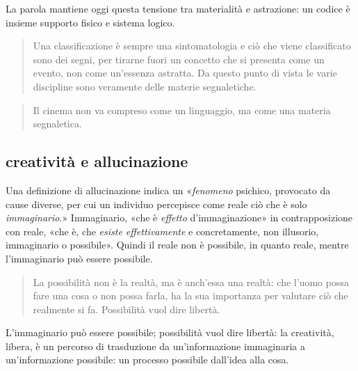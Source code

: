 La parola mantiene oggi questa tensione tra materialità e astrazione: un codice
è insieme supporto fisico e sistema logico.

\begin{quote}
\begin{sf}
\small
  Una classificazione è sempre una sintomatologia e ciò che viene classificato
  sono dei segni, per tirarne fuori un concetto che si presenta come un evento,
  non come un'essenza astratta. Da questo punto di vista le varie discipline
  sono veramente delle materie segnaletiche.
  \cite{deleuze2009}
  \end{sf}
\end{quote}

\begin{quote}
\begin{sf}
\small
  Il cinema non va compreso come un linguaggio, ma come una materia segnaletica.
  \cite{deleuze2009}
  \end{sf}
\end{quote}


\subsection{creatività e allucinazione}

Una definizione di allucinazione indica un «\emph{fenomeno} psichico,
provocato da cause diverse, per cui un individuo percepisce come reale ciò che
è solo \emph{immaginario}.» Immaginario, «che è \emph{effetto} d'immaginazione»
in contrapposizione con reale, «che è, che \emph{esiste effettivamente} e
concretamente, non illusorio, immaginario o possibile». Quindi il reale non è
possibile, in quanto reale, mentre l'immaginario può essere possibile.

\begin{quote}
  La possibilità non è la realtà, ma è anch'essa una realtà: che l'uomo possa
  fare una cosa o non possa farla, ha la sua importanza per valutare ciò che
  realmente si fa. Possibilità vuol dire libertà. \cite{ag:matst}
\end{quote}%

L'immaginario può essere possibile; possibilità vuol dire libertà: la creatività,
libera, è un percorso di trasduzione da un'informazione immaginaria a
un'informazione possibile: un processo possibile dall'idea alla cosa.

